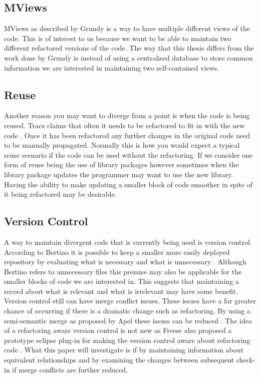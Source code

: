 \documentclass[12pt]{CRPITStyle}
\renewcommand{\cite}{\citep}
\begin{document}
\subsection{MViews}
MViews as described by Grundy is a way to have multiple different views of the code\cite{Grundy1993}. This is of interest to us because we want to be able to maintain two different refactored versions of the code. The way that this thesis differs from the work done by Grundy is instead of using a centralised database to store common information we are interested in maintaining two self-contained views.
\subsection{Reuse}
Another reason you may want to diverge from a point is when the code is being reused. Tracz claims that often it needs to be refactored to fit in with the new code \cite{Tracz1995}. Once it has been refactored any further changes in the original code need to be manually propagated. Normally this is how you would expect a typical reuse scenario if the code can be used without the refactoring. If we consider one form of reuse being the use of library packages however sometimes when the library package updates the programmer may want to use the new library. Having the ability to make updating a smaller block of code smoother in spite of it being refactored may be desirable. 
\subsection{Version Control} 
A way to maintain divergent code that is currently being used is version control. According to Bertino it is possible to keep a smaller more easily deployed repository by evaluating what is necessary and what is unnecessary \cite{Bertino2012}. Although Bertino refers to unnecessary files this premise may also be applicable for the smaller blocks of code we are interested in. This suggests that maintaining a record about what is relevant and what is irrelevant may have some benefit. Version control still can have merge conflict issues. These issues have a far greater chance of occurring if there is a dramatic change such as refactoring. By using a semi-semantic merge as proposed by Apel these issues can be reduced \cite{Apel2011}. The idea of a refactoring aware version control is not new as Freese also proposed a prototype eclipse plug-in for making the version control aware about refactoring code \cite{Freese2006}. What this paper will investigate is if by maintaining information about equivalent relationships and by examining the changes between subsequent check-in if merge conflicts are further reduced. 
\end{document}
